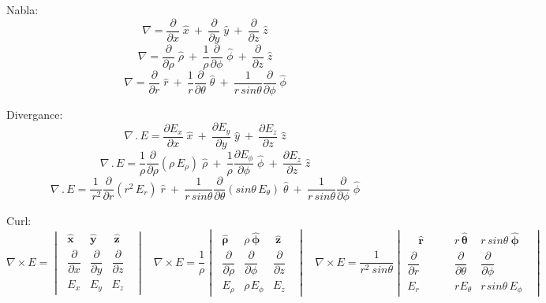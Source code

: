\par
Nabla:
$$ \nabla = \frac{\partial}{\partial x}\;\hat{x} ~+~ \frac{\partial}{\partial y}\;\hat{y} ~+~ \frac{\partial}{\partial z}\;\hat{z} $$
$$ \nabla = \frac{\partial}{\partial \rho}\;\hat{\rho} ~+~ \frac{1}{\rho}\frac{\partial}{\partial \phi}\;\hat{\phi} ~+~ \frac{\partial}{\partial z}\;\hat{z} $$
$$ \nabla = \frac{\partial}{\partial r}\;\hat{r} ~+~ \frac{1}{r}\frac{\partial}{\partial \theta}\;\hat{\theta} ~+~ \frac{1}{r\,sin\theta}\frac{\partial}{\partial \phi}\;\hat{\phi} $$
\par
Divergance:
$$ \nabla\,.\,E = \frac{\partial E_x}{\partial x}\;\hat{x} ~+~ \frac{\partial E_y}{\partial y}\;\hat{y} ~+~ \frac{\partial E_z}{\partial z}\;\hat{z} $$
$$ \nabla\,.\,E = \frac{1}{\rho} \frac{\partial}{\partial \rho} (\rho \,E_{\rho})\;\hat{\rho} ~+~ \frac{1}{\rho}\frac{\partial E_{\phi}}{\partial \phi}\;\hat{\phi} ~+~ \frac{\partial E_{z}}{\partial z}\;\hat{z} $$
$$ \nabla\,.\,E = \frac {1}{\,r^2}\frac{\partial}{\partial r} (r^2 \, E_r)\;\hat{r} ~+~ \frac{1}{r\,sin\theta}\frac{\partial}{\partial \theta}(sin\theta\, E_{\theta})\;\hat{\theta} ~+~ \frac{1}{r\,sin\theta}\frac{\partial}{\partial \phi}\;\hat{\phi} $$
\par
Curl:
$$ \nabla \times E =  \begin{vmatrix}
\;\hat{\boldsymbol{x}} & \hat{\boldsymbol{y}} & ~\hat{\boldsymbol{z}}\;\;\\[0.25em]
\;\dfrac{\partial}{\partial x} & \dfrac{\partial}{\partial y} & \dfrac{\partial}{\partial z}\;\;\\[0.8em]
\;E_x & E_y & E_z\;\;
\end{vmatrix} ~~~~
 \nabla \times E = \frac{1}{\rho} \begin{vmatrix}
\;\hat{\boldsymbol{\rho}} & \rho\,\hat{\boldsymbol{\phi}} & ~\hat{\boldsymbol{z}}\;\;\\[0.25em]
\;\dfrac{\partial}{\partial \rho} & \dfrac{\partial}{\partial \phi} & \dfrac{\partial}{\partial z}\;\;\\[0.8em]
\;E_{\rho} & \rho\hspace{1pt}E_{\phi} & E_z\;\;
\end{vmatrix} ~~~~
 \nabla \times E = \frac{1}{r^2~ sin \theta} \begin{vmatrix}
\quad\hat{\boldsymbol{r}}\quad\quad & r \, \hat{\boldsymbol{\theta}} & r\, sin \theta \:\hat{\boldsymbol{\phi}}\;\;\\[0.25em]
\dfrac{\partial}{\partial r} & \dfrac{\partial}{\partial \theta} & \dfrac{\partial}{\partial \phi}\;\;\\[0.8em]
E_{r} & r E_{\theta} & r \hspace{1pt} sin \theta \, E_{\phi}\;\;
\end{vmatrix}$$
